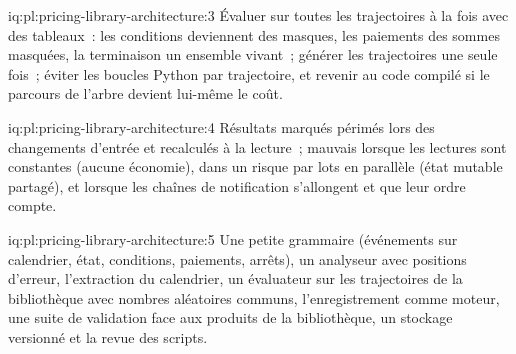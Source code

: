 \begin{solution}{iq:pl:pricing-library-architecture:3}
Évaluer sur toutes les trajectoires à la fois avec des tableaux~: les conditions deviennent des masques, les paiements des sommes masquées, la terminaison un ensemble vivant~; générer les trajectoires une seule fois~;
éviter les boucles Python par trajectoire, et revenir au code compilé si le parcours de l'arbre devient lui-même le coût.
\end{solution}

\begin{solution}{iq:pl:pricing-library-architecture:4}
Résultats marqués périmés lors des changements d'entrée et recalculés à la lecture~; mauvais lorsque les lectures sont constantes (aucune économie), dans un risque par lots en parallèle (état
mutable partagé), et lorsque les chaînes de notification s'allongent et que leur ordre compte.
\end{solution}

\begin{solution}{iq:pl:pricing-library-architecture:5}
Une petite grammaire (événements sur calendrier, état, conditions, paiements, arrêts), un analyseur avec positions d'erreur, l'extraction du calendrier, un évaluateur sur
les trajectoires de la bibliothèque avec nombres aléatoires communs, l'enregistrement comme moteur, une suite de validation face aux produits de la bibliothèque, un stockage versionné et
la revue des scripts.
\end{solution}
